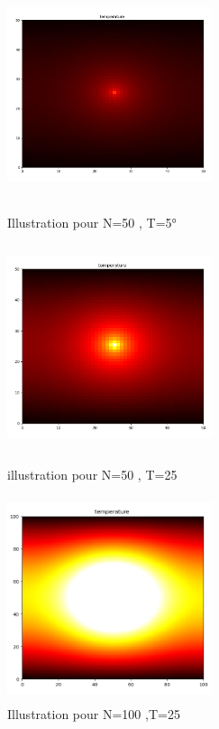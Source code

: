 \documentclass{article}
\begin{document}
\begin{enumerate}
\begin{enumerate}
   	\paragraph{}
   	\begin{figure}
   		\begin{minipage}[c]{.46\linewidth}
   			\centering
   			\includegraphics[width=6cm,height=6cm]{centreN50T5.png}
   			\caption{Illustration pour N=50 , T=5° }
   			\label{radiateur au centre (N=50 , T=5)}
   	\end{minipage} \hfill 
  
   	\begin{minipage}[c]{.46\linewidth}
   		\centering
   		\includegraphics[width=6cm,height=6cm]{centreN50T25.png}
   		\caption{illustration pour N=50 , T=25}
   		\label{radiateur au centre (N=50 , T=25 )}
  	\end{minipage} \hfill


	\begin{minipage}[c]{.46\linewidth}
		\centering
		\includegraphics[width=6cm,height=6cm]{centreN100T25.png}
		\caption{Illustration pour N=100 ,T=25 }
		\label{radiateur au centre (N=100 , T=25 ) }
	\end{minipage} \hfill
\end{figure} 


\end{enumerate}
\end{enumerate}
\end{document}
